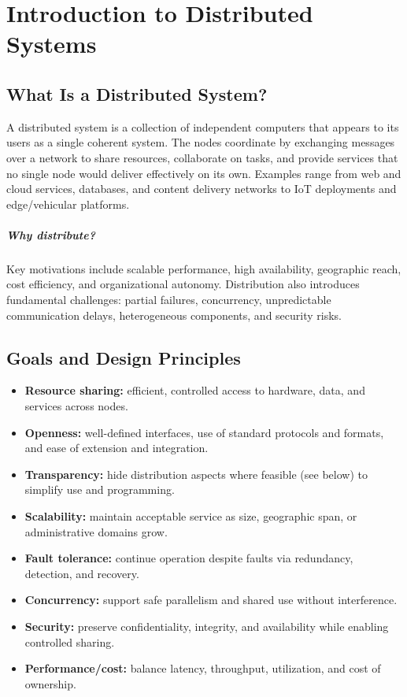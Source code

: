 \chapter{Introduction to Distributed Systems}
\label{ch:introduction}

\section{What Is a Distributed System?}
A distributed system is a collection of independent computers that appears to its users as a single coherent system. The nodes coordinate by exchanging messages over a network to share resources, collaborate on tasks, and provide services that no single node would deliver effectively on its own. Examples range from web and cloud services, databases, and content delivery networks to IoT deployments and edge/vehicular platforms.

\paragraph{Why distribute?} Key motivations include scalable performance, high availability, geographic reach, cost efficiency, and organizational autonomy. Distribution also introduces fundamental challenges: partial failures, concurrency, unpredictable communication delays, heterogeneous components, and security risks.

\section{Goals and Design Principles}
\begin{itemize}
  \item \textbf{Resource sharing:} efficient, controlled access to hardware, data, and services across nodes.
  \item \textbf{Openness:} well-defined interfaces, use of standard protocols and formats, and ease of extension and integration.
  \item \textbf{Transparency:} hide distribution aspects where feasible (see below) to simplify use and programming.
  \item \textbf{Scalability:} maintain acceptable service as size, geographic span, or administrative domains grow.
  \item \textbf{Fault tolerance:} continue operation despite faults via redundancy, detection, and recovery.
  \item \textbf{Concurrency:} support safe parallelism and shared use without interference.
  \item \textbf{Security:} preserve confidentiality, integrity, and availability while enabling controlled sharing.
  \item \textbf{Performance/cost:} balance latency, throughput, utilization, and cost of ownership.
\end{itemize}

